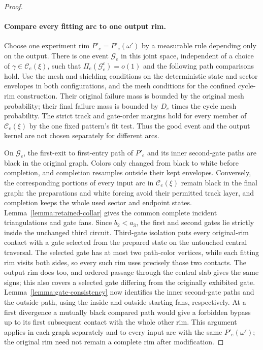 \begin{proof}
\paragraph{Compare every fitting arc to one output rim.}
Choose one experiment rim $P'_e=P'_e(\omega')$ by a measurable
rule depending only on the output.  There is one event
$\mathcal G_e$ in this joint space, independent of a choice of
$\gamma\in\mathscr C_e(\xi)$, such that
$\Pi_e(\mathcal G_e^c)=o(1)$ and the following path comparisons
hold.  Use the mesh and shielding conditions on the deterministic
state and sector envelopes in both configurations, and the
mesh conditions for the confined cycle-rim construction.
Their original failure mass is bounded by the original mesh
probability; their final failure mass is bounded by $D_e$ times
the cycle mesh probability.  The strict track and gate-order
margins hold for every member of $\mathscr C_e(\xi)$ by the one
fixed pattern's fit test.  Thus the good event and the output
kernel are not chosen separately for different arcs.

On $\mathcal G_e$, the first-exit to first-entry path of $P'_e$
and its inner second-gate paths are black in the original graph.
Colors only changed from black to white before completion,
and completion resamples outside their kept envelopes.
Conversely, the corresponding portions of every input arc in
$\mathscr C_e(\xi)$ remain black in the final graph: the
preparations and white forcing avoid their permitted track layer,
and completion keeps the whole used sector and endpoint states.
Lemma~\ref{lemma:retained-collar} gives the common complete
incident triangulations and gate fans. Since $b_2<a_3$, the first
and second gates lie strictly inside the unchanged third circuit.
Third-gate isolation puts every original-rim contact with a gate selected from the
prepared state on the untouched central traversal.  The selected
gate has at most two path-color vertices, while each fitting rim
visits both sides, so every such rim uses precisely those two
contacts.  The output rim does too, and ordered passage through
the central slab gives the same signs; this also covers a selected
gate differing from the originally exhibited gate.
Lemma~\ref{lemma:gate-consistency} now
identifies the inner second-gate paths and the outside path,
using the inside and outside starting fans, respectively.
At a first divergence a mutually black compared path would give
a forbidden bypass up to its first subsequent contact with the
whole other rim.  This argument applies in each graph separately
and to every input arc with the same $P'_e(\omega')$; the original
rim need not remain a complete rim after modification.


\end{proof}
